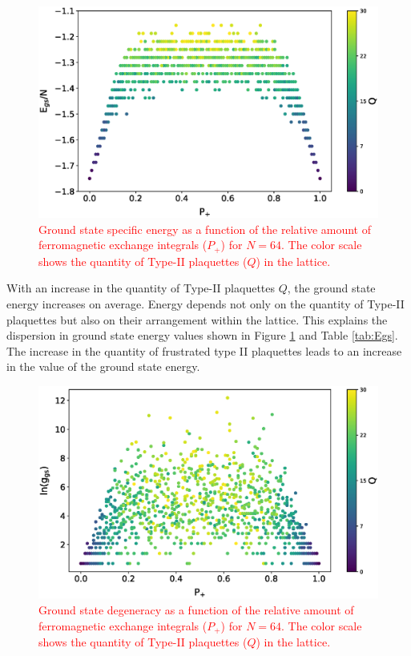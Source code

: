 \documentclass[preprint,12pt]{elsarticle}
\begin{document}
	\begin{figure}[H]
		\centering
		\includegraphics[width=1.0\linewidth]{pictures/E_P_Q.eps}
		\caption{\textcolor{red}{Ground state specific energy as a function of the relative amount of ferromagnetic exchange integrals ($P_+$) for $N=64$. The color scale shows the quantity of Type-II plaquettes ($Q$) in the lattice.}}
		\label{fig:E(Q)}
	\end{figure}
	
	With an increase in the quantity of Type-II plaquettes $Q$, the ground state energy increases on average. Energy depends not only on the quantity of Type-II plaquettes but also on their arrangement within the lattice. This explains the dispersion in ground state energy values shown in Figure \ref{fig:E(Q)} and Table \ref{tab:Egs}. The increase in the quantity of frustrated type II plaquettes leads to an increase in the value of the ground state energy.
	
	
	\begin{figure}[H]
		\centering
		\includegraphics[width=1.0\linewidth]{pictures/lng_P_Q.eps}
		\caption{\textcolor{red}{Ground state degeneracy as a function of the relative amount of ferromagnetic exchange integrals ($P_+$) for $N=64$. The color scale shows the quantity of Type-II plaquettes ($Q$) in the lattice.}}
		\label{fig:g(Q)}
	\end{figure}
	
\end{document}
